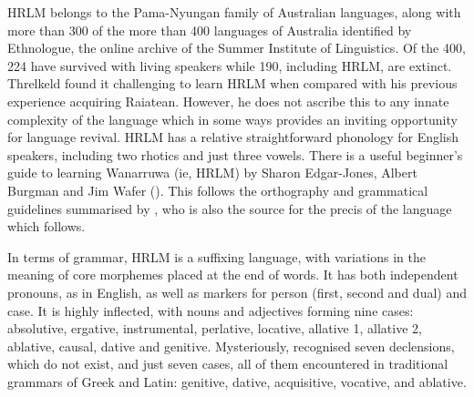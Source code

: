 {HRLM belongs to the Pama-Nyungan family of Australian languages, along with more than 300 of the more than 400 languages of Australia identified by Ethnologue, the online archive of the Summer Institute of Linguistics. Of the 400, 224 have survived with living speakers while 190, including HRLM, are extinct. Threlkeld found it challenging to learn HRLM when compared with his previous experience acquiring Raiatean. However, he does not ascribe this to any innate complexity of the language which in some ways provides an inviting opportunity for language revival. HRLM has a relative straightforward phonology for English speakers, including two rhotics and just three vowels. There is a useful beginner’s guide to learning Wanarruwa (ie, HRLM) by Sharon Edgar-Jones, Albert Burgman and Jim Wafer (\citeyear{edgar-jones_wanarruwa_2019}). This follows the orthography and grammatical guidelines summarised by \citet{lissarrague_salvage_2006}, who is also the source for the precis of the language which follows.

In terms of grammar, HRLM is a suffixing language, with variations in the meaning of core morphemes placed at the end of words. It has both independent pronouns, as in English, as well as markers for person (first, second and dual) and case. It is highly inflected, with nouns and adjectives forming nine cases: absolutive, ergative, instrumental, perlative, locative, allative 1, allative 2, ablative, causal, dative and genitive. Mysteriously, \citet[10]{threlkeld_australian_1834} recognised seven declensions, which do not exist, and just seven cases, all of them encountered in traditional grammars of Greek and Latin: genitive, dative, acquisitive, vocative, and ablative.

}
